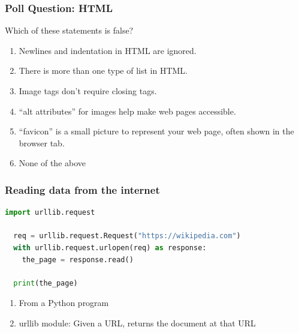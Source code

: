 \documentclass{beamer}
\begin{document}
%
%
\begin{frame}[fragile]
  \frametitle{Poll Question: HTML}
  Which of these statements is false?
  \begin{enumerate}[A]
    \item Newlines and indentation in HTML are ignored.
    \item There is more than one type of list in HTML.
    \item Image tags don't require closing tags.
    \item ``alt attributes'' for images help make web pages accessible.
    \item ``favicon'' is a small picture to represent your web page, often shown in the browser tab.
    \item None of the above
  \end{enumerate}
\end{frame}


%
%
\begin{frame}[fragile]
  \frametitle{Reading data from the internet}
  \begin{lstlisting}[language=Python]
  import urllib.request

  req = urllib.request.Request("https://wikipedia.com")
  with urllib.request.urlopen(req) as response:
    the_page = response.read()

  print(the_page)
  \end{lstlisting} 
  \vfill
  \begin{enumerate}[A]
    \item From a Python program
    \item urllib module: Given a URL, returns the document at that URL
  \end{enumerate}
\end{frame}
\end{document}
